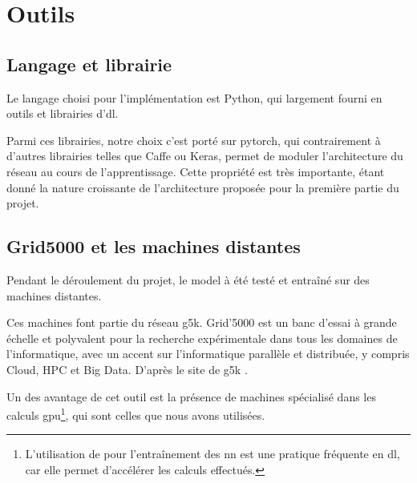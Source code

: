\section{Outils}
\subsection{Langage et librairie}
Le langage choisi pour l'implémentation est Python, qui largement fourni en outils et librairies d'\gls{dl}.

Parmi ces librairies, notre choix c'est porté sur \gls{pytorch}, qui contrairement à d'autres librairies telles que Caffe ou Keras, permet de moduler l'architecture du réseau au cours de l'apprentissage. Cette propriété est très importante, étant donné la nature \og croissante\fg{} de l'architecture proposée pour la première partie du projet.

\subsection{Grid5000 et les machines distantes}
Pendant le déroulement du projet, le \gls{model} à été testé et entraîné sur des machines distantes.

Ces machines font partie du réseau \gls{g5k}.
\og Grid'5000 est un banc d'essai à grande échelle et polyvalent pour la recherche expérimentale dans tous les domaines de l'informatique, avec un accent sur l'informatique parallèle et distribuée, y compris Cloud, HPC et Big Data. \fg{} D'après le site de \gls{g5k} \autocite{g5k}.

Un des avantage de cet outil est la présence de machines spécialisé dans les calculs \gls{gpu}\footnote{L'utilisation de  pour l'entraînement des \gls{nn} est une pratique fréquente en \gls{dl}, car elle permet d'accélérer les calculs effectués.}, qui sont celles que nous avons utilisées.